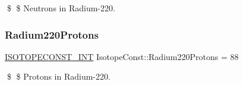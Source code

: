\$ \$ Neutrons in Radium-\/220. \mbox{\label{group___isotope_const-_radium-_ra220_gaa4b2aa9e92314625aa124a0439785d11}} 
\subsubsection{\texorpdfstring{Radium220\+Protons}{Radium220Protons}}
{\footnotesize\ttfamily \mbox{\hyperlink{group___isotope_const-_macros_ga5f18360b3e99483a35c32d789e62621c}{I\+S\+O\+T\+O\+P\+E\+C\+O\+N\+S\+T\+\_\+\+I\+NT}} Isotope\+Const\+::\+Radium220\+Protons = 88}

\$ \$ Protons in Radium-\/220. 